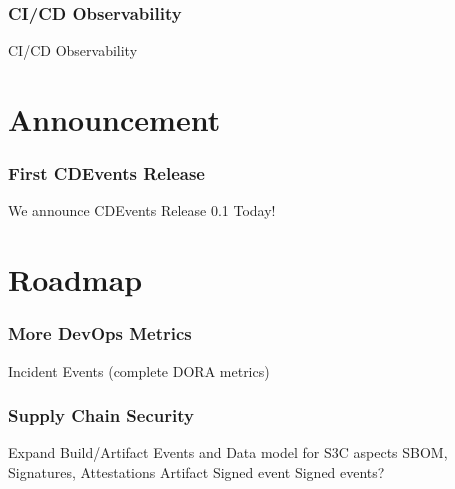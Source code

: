 \documentclass[aspectratio=169,11pt,hyperref={colorlinks=true}]{beamer}
\begin{document}
\begin{lgrayrwhiteframe}
  \frametitle{CI/CD Observability}
  CI/CD Observability
\end{lgrayrwhiteframe}

\section{Announcement}

\begin{lgrayrwhiteframe}
  \frametitle{First CDEvents Release}
  We announce CDEvents Release 0.1 Today!
\end{lgrayrwhiteframe}

\section{Roadmap}

\begin{lgrayrwhiteframe}
  \frametitle{More DevOps Metrics}
  Incident Events (complete DORA metrics)
\end{lgrayrwhiteframe}

\begin{lgrayrwhiteframe}
  \frametitle{Supply Chain Security}
  Expand Build/Artifact Events and Data model for S3C aspects
    SBOM, Signatures, Attestations
    Artifact Signed event
  Signed events?
\end{lgrayrwhiteframe}
\end{document}
